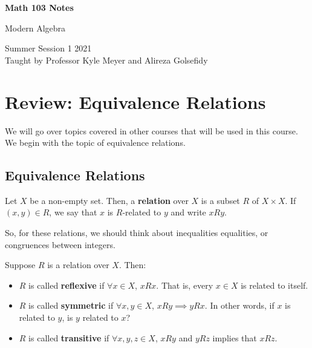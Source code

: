 \documentclass[letterpaper]{article}
\begin{document}
\begin{titlepage}
    \begin{center}
        \vspace*{1cm}
            
        \Huge
        \textbf{Math 103 Notes}
            
        \vspace{0.5cm}
        \LARGE
        Modern Algebra
            
        \vspace{1.5cm}
            
        \vfill
            
        Summer Session 1 2021\\
        Taught by Professor Kyle Meyer and Alireza Golsefidy
    \end{center}
\end{titlepage}


\newpage 

\begingroup
    \renewcommand\contentsname{Table of Contents}
    \tableofcontents
\endgroup

\newpage
{}

\section{Review: Equivalence Relations}
We will go over topics covered in other courses that will be used in this course. We begin with the topic of equivalence relations. 

\subsection{Equivalence Relations}
Let $X$ be a non-empty set. Then, a \textbf{relation} over $X$ is a subset $R$ of $X \times X$. If $(x, y) \in R$, we say that $x$ is $R$-related to $y$ and write $x R y$. 

\bigskip 

So, for these relations, we should think about inequalities equalities, or congruences between integers. 

\bigskip 

Suppose $R$ is a relation over $X$. Then:
\begin{itemize}
    \item $R$ is called \textbf{reflexive} if $\forall x \in X$, $x R x$. That is, every $x \in X$ is related to itself. 
    \item $R$ is called \textbf{symmetric} if $\forall x, y \in X$, $x R y \implies y R x$. In other words, if $x$ is related to $y$, is $y$ related to $x$? 
    \item $R$ is called \textbf{transitive} if $\forall x, y, z \in X$, $x R y$ and $y R z$ implies that $x R z$. 
\end{itemize}
\end{document}
